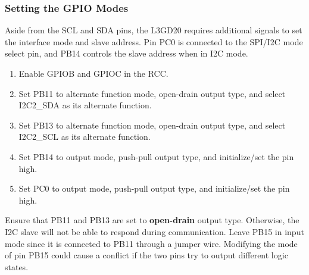 \documentclass[openany,11pt,fleqn]{book} %
\begin{document}
\begin{exercise}
	\subsubsection{Setting the GPIO Modes}
	Aside from the SCL and SDA pins, the L3GD20 requires additional signals to set the interface mode and slave address. Pin PC0 is connected to the SPI/I2C mode select pin, and PB14 controls the slave address when in I2C mode. 
	
	\begin{enumerate}
	    \item Enable GPIOB and GPIOC in the RCC. 
	    \item Set PB11 to alternate function mode, open-drain output type, and select I2C2\_SDA as its alternate function.
	    \item Set PB13 to alternate function mode, open-drain output type, and select I2C2\_SCL as its alternate function.
	    \item Set PB14 to output mode, push-pull output type, and initialize/set the pin high.
	    \item Set PC0 to output mode, push-pull output type, and initialize/set the pin high.
	\end{enumerate}
\end{exercise}

\begin{warning}
    Ensure that PB11 and PB13 are set to \textbf{open-drain} output type. Otherwise, the I2C slave will not be able to respond during communication. Leave PB15 in input mode since it is connected to PB11 through a jumper wire. Modifying the mode of pin PB15 could cause a conflict if the two pins try to output different logic states. 
\end{warning}
\end{document}
